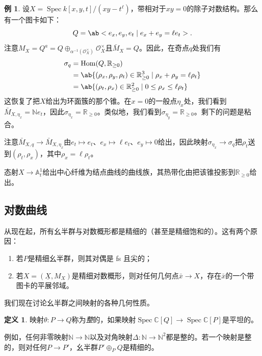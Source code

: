 \documentclass{amsart}
\theoremstyle{definition}
\newtheorem{defn}[thm]{定义}
\newtheorem{exm}[thm]{例}
\theoremstyle{remark}
\theoremstyle{plain}
\theoremstyle{definition}
\theoremstyle{remark}
\newcommand{\A}{\mathbb{A}}
\newcommand{\N}{\mathbb{N}}
\newcommand{\R}{\mathbb{R}}
\newcommand{\C}{\mathbb{C}}
\newcommand{\mc}[1]{\mathcal{#1}}
\newcommand{\ul}[1]{\underline{#1}}
\newcommand{\1}{\mathbf{1}}
\newcommand{\2}{\mathbf{2}}
\newcommand{\3}{\mathbf{3}}
\DeclareMathOperator{\Hom}{Hom}
\DeclareMathOperator{\Spec}{Spec}
\begin{document}
\begin{exm}
    设\(X = \Spec k[x,y,t]/(xy-t^{\ell})\)，带相对于\(xy = 0\)的除子对数结构。那么有一个图卡如下：
    \[ Q = \ab<e_x, e_y, e_t \mid e_x + e_y = \ell e_t>. \]
    注意\(M_X = Q^a = Q \oplus_{\alpha^{-1}(\mc{O}_X^{\times})} \mc{O}_X^{\times}\)且\(\bar{M}_X = Q\)。因此，在奇点\(q\)处我们有
    \begin{align*}
        \sigma_q &= \Hom(Q, \R_{\geq 0}) \\
        &= \ab\{ (\rho_x, \rho_y, \rho_t) \in \R_{\geq 0}^3 \mid \rho_x + \rho_y = \ell \rho_t \} \\
        &= \ab\{ (\rho_t, \rho_x) \in \R_{\geq 0}^2 \mid 0 \leq \rho_x \leq \ell \rho_t \}
    \end{align*}
    这恢复了把\(X\)给出为环面簇的那个锥。在\(x = 0\)的一般点\(\eta_x\)处，我们看到\(\bar{M}_{X, \eta_x} = \N e_t\)，因此\(\sigma_{\eta_x} = \R_{\geq 0}\)。类似地，我们看到\(\sigma_{\eta_y} = \R_{\geq 0}\)。剩下的问题是粘合。

    注意\(\bar{M}_{X, q} \to \bar{M}_{X, \eta_x}\)由\(e_t \mapsto e_t\)、\(e_x \mapsto \ell e_t\)、\(e_y \mapsto 0\)给出，因此映射\(\sigma_{\eta_x} \to \sigma_q\)把\(\rho_t\)送到\((\rho_t, \rho_x)\)，其中\(\rho_x = \ell \rho_t\)。

    态射\(X \to \A^1_t\)给出中心纤维为结点曲线的曲线族，其热带化由把该锥投影到\(\R_{\geq 0}\)给出。
\end{exm}


\subsection{对数曲线}%
\label{sub:Log curves}

从现在起，所有幺半群与对数概形都是精细的（甚至是精细饱和的）。这有两个原因：
\begin{enumerate}
    \item 若\(P\)是精细幺半群，则其对偶是 fs 且尖的；
    \item 若\(X = (\ul{X}, M_X)\)是精细对数概形，则对任何几何点\(\bar{x} \to X\)，存在\(\bar{x}\)的一个带图卡的平展邻域。
\end{enumerate}

我们现在讨论幺半群之间映射的各种几何性质。
\begin{defn}
    映射\(\theta \colon P \to Q\)称为\textit{整}的，如果映射\(\Spec\C[Q] \to \Spec \C[P]\)是平坦的。
\end{defn}

例如，任何非零映射\(\N \to \N\)以及对角映射\(\Delta \colon\N \to \N^2\)都是整的。若一个映射是整的，则对任何\(P \to P'\)，幺半群\(P' \oplus_P Q\)是精细的。
\end{document}
